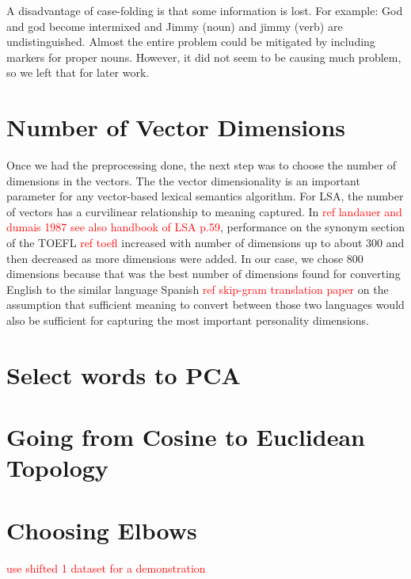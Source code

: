 \documentclass[10pt,letterpaper]{book}
\newcommand{\todo}[1]{\textcolor{red}{#1}}
\begin{document}
A disadvantage of case-folding is that some information is lost. For example: God and god become intermixed and Jimmy (noun) and jimmy (verb) are undistinguished. Almost the entire problem could be mitigated by including markers for proper nouns. However, it did not seem to be causing much problem, so we left that for later work.

\section{Number of Vector Dimensions}

Once we had the preprocessing done, the next step was to choose the number of dimensions in the vectors. The the vector dimensionality is an important parameter for any vector-based lexical semantics algorithm. For LSA, the number of vectors has a curvilinear relationship to meaning captured. In \todo{ref landauer and dumais 1987 see also handbook of LSA p.59}, performance on the synonym section of the TOEFL \todo{ref toefl} increased with number of dimensions up to about 300 and then decreased as more dimensions were added. In our case, we chose 800 dimensions because that was the best number of dimensions found for converting English to the similar language Spanish \todo{ref skip-gram translation paper} on the assumption that sufficient meaning to convert between those two languages would also be sufficient for capturing the most important personality dimensions.

\section{Select words to PCA}

\section{Going from Cosine to Euclidean Topology}

\section{Choosing Elbows}

\todo{use shifted 1 dataset for a demonstration}
\end{document}
